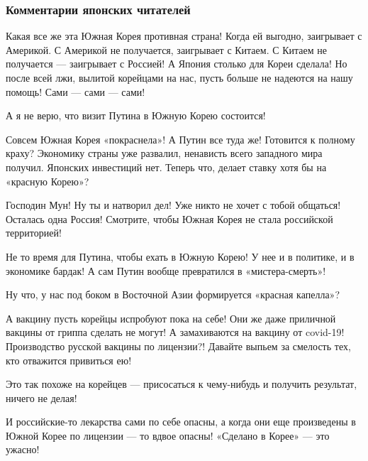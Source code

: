  
 
 
 
 
\subsubsection{Комментарии японских читателей}

\begin{itemize}

Какая все же эта Южная Корея противная страна! Когда ей выгодно, заигрывает с
Америкой. С Америкой не получается, заигрывает с Китаем. С Китаем не получается
— заигрывает с Россией! А Япония столько для Кореи сделала! Но после всей лжи,
вылитой корейцами на нас, пусть больше не надеются на нашу помощь! Сами — сами
— сами!


А я не верю, что визит Путина в Южную Корею состоится!


Совсем Южная Корея «покраснела»! А Путин все туда же! Готовится к полному
краху? Экономику страны уже развалил, ненависть всего западного мира получил.
Японских инвестиций нет. Теперь что, делает ставку хотя бы на «красную Корею»?


Господин Мун! Ну ты и натворил дел! Уже никто не хочет с тобой общаться!
Осталась одна Россия! Смотрите, чтобы Южная Корея не стала российской
территорией!


Не то время для Путина, чтобы ехать в Южную Корею! У нее и в политике, и в
экономике бардак! А сам Путин вообще превратился в «мистера-смерть»!


Ну что, у нас под боком в Восточной Азии формируется «красная капелла»?


А вакцину пусть корейцы испробуют пока на себе! Они же даже приличной вакцины
от гриппа сделать не могут! А замахиваются на вакцину от covid-19! Производство
русской вакцины по лицензии?! Давайте выпьем за смелость тех, кто отважится
привиться ею!


Это так похоже на корейцев — присосаться к чему-нибудь и получить результат,
ничего не делая!


И российские-то лекарства сами по себе опасны, а когда они еще произведены в
Южной Корее по лицензии — то вдвое опасны! «Сделано в Корее» — это ужасно!
\end{itemize}
